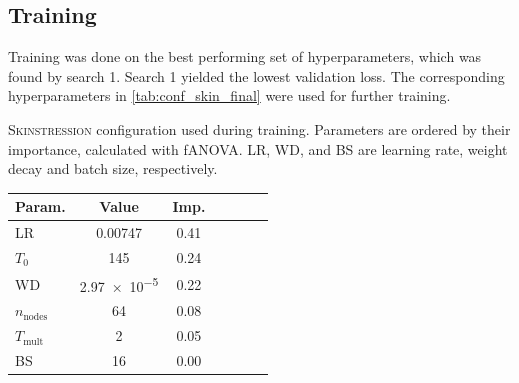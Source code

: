 

\subsection{Training}
Training was done on the best performing set of hyperparameters, which was found by search 1.
Search 1 yielded the lowest validation loss.
The corresponding hyperparameters in \cref{tab:conf_skin_final} were used for further training.

\begin{margintable}
    \centering
    \caption[\textsc{Skinstression} configuration]{
        \textsc{Skinstression} configuration used during training.
        Parameters are ordered by their importance, calculated with fANOVA.
        LR, WD, and BS are learning rate, weight decay and batch size, respectively.
    }
    \label{tab:conf_skin_final}
    \begin{tabular}{l c c c c c c}
        \toprule
        Param.               & Value         & Imp. \\
        \midrule
        {LR}                 & 0.00747       & 0.41 \\
        {$T_0$}              & 145           & 0.24 \\
        {WD}                 & \num{2.97e-5} & 0.22 \\
        {$n_\mathrm{nodes}$} & 64            & 0.08 \\
        {$T_\mathrm{mult}$}  & 2             & 0.05 \\
        {BS}                 & 16            & 0.00 \\
        \bottomrule
    \end{tabular}
\end{margintable}

